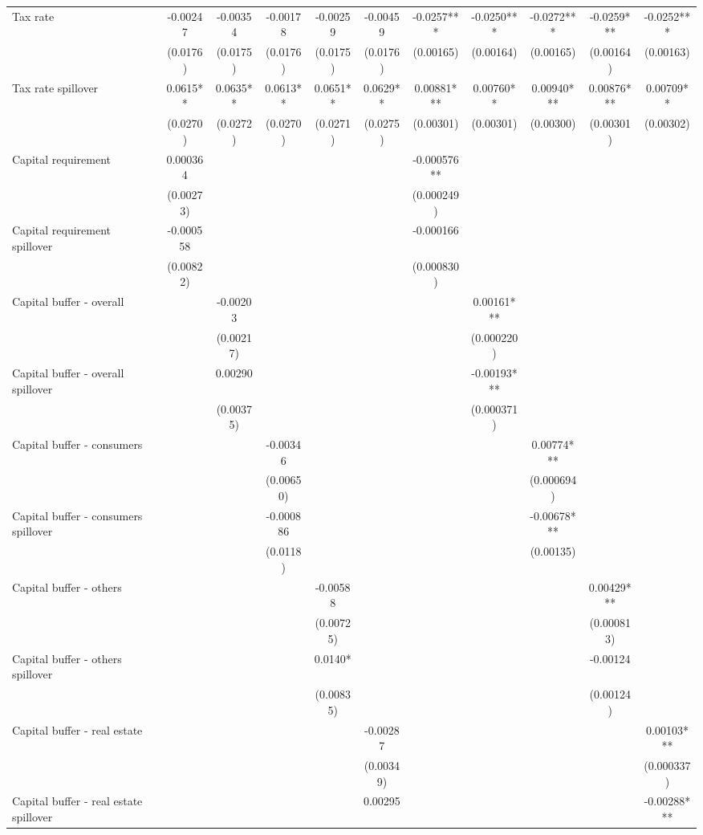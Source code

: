 \begin{tabular}{lcccccccccc}
Tax rate & -0.00247 & -0.00354 & -0.00178 & -0.00259 & -0.00459 & -0.0257*** & -0.0250*** & -0.0272*** & -0.0259*** & -0.0252*** \\
 & (0.0176) & (0.0175) & (0.0176) & (0.0175) & (0.0176) & (0.00165) & (0.00164) & (0.00165) & (0.00164) & (0.00163) \\
Tax rate spillover & 0.0615** & 0.0635** & 0.0613** & 0.0651** & 0.0629** & 0.00881*** & 0.00760** & 0.00940*** & 0.00876*** & 0.00709** \\
 & (0.0270) & (0.0272) & (0.0270) & (0.0271) & (0.0275) & (0.00301) & (0.00301) & (0.00300) & (0.00301) & (0.00302) \\
Capital requirement & 0.000364 &  &  &  &  & -0.000576** &  &  &  &  \\
 & (0.00273) &  &  &  &  & (0.000249) &  &  &  &  \\
Capital requirement spillover & -0.000558 &  &  &  &  & -0.000166 &  &  &  &  \\
 & (0.00822) &  &  &  &  & (0.000830) &  &  &  &  \\
Capital buffer - overall &  & -0.00203 &  &  &  &  & 0.00161*** &  &  &  \\
 &  & (0.00217) &  &  &  &  & (0.000220) &  &  &  \\
Capital buffer - overall spillover &  & 0.00290 &  &  &  &  & -0.00193*** &  &  &  \\
 &  & (0.00375) &  &  &  &  & (0.000371) &  &  &  \\
Capital buffer - consumers &  &  & -0.00346 &  &  &  &  & 0.00774*** &  &  \\
 &  &  & (0.00650) &  &  &  &  & (0.000694) &  &  \\
Capital buffer - consumers spillover &  &  & -0.000886 &  &  &  &  & -0.00678*** &  &  \\
 &  &  & (0.0118) &  &  &  &  & (0.00135) &  &  \\
Capital buffer - others &  &  &  & -0.00588 &  &  &  &  & 0.00429*** &  \\
 &  &  &  & (0.00725) &  &  &  &  & (0.000813) &  \\
Capital buffer - others spillover &  &  &  & 0.0140* &  &  &  &  & -0.00124 &  \\
 &  &  &  & (0.00835) &  &  &  &  & (0.00124) &  \\
Capital buffer - real estate &  &  &  &  & -0.00287 &  &  &  &  & 0.00103*** \\
 &  &  &  &  & (0.00349) &  &  &  &  & (0.000337) \\
Capital buffer - real estate spillover &  &  &  &  & 0.00295 &  &  &  &  & -0.00288*** \\

\end{tabular}
